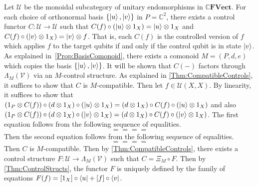 \begin{exa}
    \label{Ex:StdCtrlStruct}
    Let $\mathcal{U}$ be the monoidal subcategory of unitary endomorphisms in $\mathbb{C}\mathbf{FVect}$.
    For each choice of orthonormal basis $\{ \ket{u}, \ket{v} \}$ in $P = \mathbb{C}^2$, there exists a control functor $C: \mathcal{U} \to \mathcal{U}$ such that $C( f ) \circ ( \ket{u} \otimes 1_X ) = \ket{u} \otimes 1_X$ and $C( f ) \circ ( \ket{v} \otimes 1_X ) = \ket{v} \otimes f$.
    That is, each $C( f )$ is the controlled version of $f$ which applies $f$ to the target qubits if and only if the control qubit is in state $\ket{v}$.
    As explained in~\cref{Prop:BasisComonoid}, there exists a comonoid $M = ( P, d, e )$ which copies the basis $\{ \ket{u}, \ket{v} \}$.
    It will be shown that $C( - )$ factors through $\Lambda_M( \mathcal{V} )$ via an $M$-control structure.
    As explained in \cref{Thm:CompatibleControls}, it suffices to show that $C$ is $M$-compatible.
    Then let $f \in \mathcal{U}( X, X )$.
    By linearity, it suffices to show that $( 1_P \otimes C( f ) ) \circ ( d \otimes 1_X ) \circ ( \ket{u} \otimes 1_X ) = ( d \otimes 1_X ) \circ C( f ) \circ ( \ket{u} \otimes 1_X )$ and also $( 1_P \otimes C( f ) ) \circ ( d \otimes 1_X ) \circ ( \ket{v} \otimes 1_X ) = ( d \otimes 1_X ) \circ C( f ) \circ ( \ket{v} \otimes 1_X )$.
    The first equation follows from the following sequence of equalities.
    \begin{equation*}
        
        =
        
        =
        
        =
        
        =
        
    \end{equation*}
    Then the second equation follows from the following sequence of equalities.
    \begin{equation*}
        
        =
        
        =
        
        =
        
        =
        
    \end{equation*}
    Then $C$ is $M$-compatible.
    Then by \cref{Thm:CompatibleControls}, there exists a control structure $F: \mathcal{U} \to \Lambda_M( \mathcal{V} )$ such that $C = \Xi_M \circ F$.
    Then by \cref{Thm:ControlStructs}, the functor $F$ is uniquely defined by the family of equations $F( f ) = [ 1_X ] \circ \bra{u} + [ f ] \circ \bra{v}$.
\end{exa}

